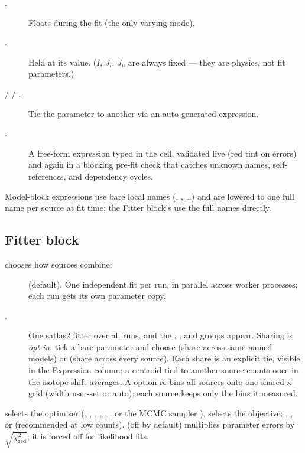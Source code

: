 \begin{description}
    \item[.] Floats during the fit (the only varying mode).
    \item[.] Held at its value. ($I$, $J_l$, $J_u$ are
        always fixed --- they are physics, not fit parameters.)
    \item[ /  / .] Tie the
        parameter to another via an auto-generated expression.
    \item[.] A free-form expression typed in the
         cell, validated live (red tint on errors)
        and again in a blocking pre-fit check that catches unknown
        names, self-references, and dependency cycles.
\end{description}

Model-block expressions use bare local names (,
, \dots) and are lowered to one full
 name per source at fit
time; the Fitter block's  use the full
names directly.

\subsection{Fitter block}

 chooses how sources combine:

\begin{description}
    \item[] (default). One independent fit
        per run, in parallel across worker processes; each run gets
        its own parameter copy.
    \item[.] One satlas2 fitter over all runs, and
        the , , and
         groups appear. Sharing is \emph{opt-in}:
        tick a bare parameter and choose  (share across
        same-named models) or  (share across every source).
        Each share is an explicit tie, visible in the Expression
        column; a centroid tied to another source counts once in
        the isotope-shift averages.
        A  option re-bins all sources onto one
        shared x grid (width user-set or auto); each source keeps
        only the bins it measured.
\end{description}

 selects the optimiser (,
, , , ,
, or the MCMC sampler ). 
selects the objective: , , or
 (recommended at low counts).  (off by default) multiplies parameter errors by
$\sqrt{\chi^2_{\mathrm{red}}}$; it is forced off for likelihood
fits.

